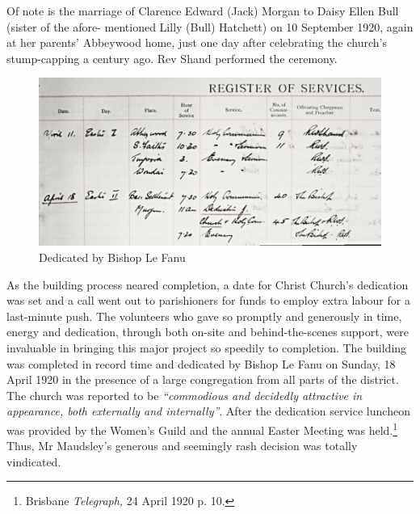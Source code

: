 Of note is the marriage of Clarence Edward (Jack) Morgan to Daisy Ellen Bull (sister of the afore- mentioned Lilly (Bull) Hatchett) on 10 September 1920, again at her parents' Abbeywood home, just one day after celebrating the church's stump-capping a century ago. Rev Shand performed the ceremony.









\begin{figure}[!htb]
\begin{center}
\includegraphics[width=1.\textwidth,center]{../images/dedicationByBishopLeFanu.jpg}
\caption{Dedicated by Bishop Le Fanu}
\end{center}
\end{figure}




As the building process neared completion, a date for Christ Church's dedication was set and a call went out to parishioners for funds to employ extra labour for a last-minute push. The volunteers who gave so promptly and generously in time, energy and dedication, through both on-site and behind-the-scenes support, were invaluable in bringing this major project so speedily to completion. The building was completed in record time and dedicated by Bishop Le Fanu on Sunday, 18 April 1920 in the presence of a large congregation from all parts of the district. The church was reported to be \emph{``commodious and decidedly attractive in appearance, both externally and internally''}. After the dedication service luncheon was provided by the Women's Guild and the annual Easter Meeting was held.\footnote{Brisbane \emph{Telegraph,} 24 April 1920 p. 10.} Thus, Mr Maudsley's generous and seemingly rash decision was totally vindicated.








